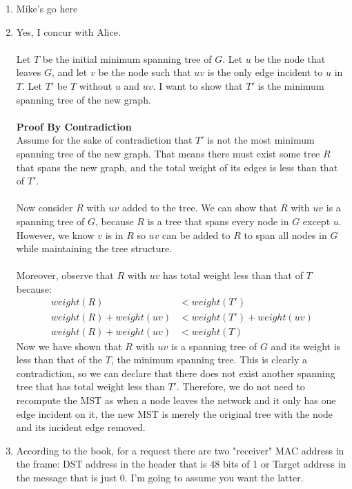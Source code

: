 \documentclass[12pt]{article}
\begin{document}
\begin{enumerate}
	\item Mike's go here
	\item Yes, I concur with Alice. \\ \\Let $T$ be the initial minimum spanning tree of $G$. Let $u$ be the node that leaves $G$, and let $v$ be the node such that $uv$ is the only edge incident to $u$ in $T$. Let $T'$ be $T$ without $u$ and $uv$. I want to show that $T'$ is the minimum spanning tree of the new graph. \\ \\ \textbf{Proof By Contradiction} \\ Assume for the sake of contradiction that $T'$ is not the most minimum spanning tree of the new graph. That means there must exist some tree $R$ that spans the new graph, and the total weight of its edges is less than that of $T'$. \\ \\ Now consider $R$ with $uv$ added to the tree. We can show that $R$ with $uv$ is a spanning tree of $G$, because $R$ is a tree that spans every node in $G$ except $u$. However, we know $v$ is in $R$ so $uv$ can be added to $R$ to span all nodes in $G$ while maintaining the tree structure. \\ \\ Moreover, observe that $R$ with $uv$ has total weight less than that of $T$ because:
	\begin{align*}
	weight(R) &< weight(T')\\
	weight(R) + weight(uv) &< weight(T') + weight(uv)\\
	weight(R) + weight(uv) &< weight(T)
	\end{align*}
	Now we have shown that $R$ with $uv$ is a spanning tree of $G$ and its weight is less than that of the $T$, the minimum spanning tree. This is clearly a contradiction, so we can declare that there does not exist another spanning tree that has total weight less than $T'$. Therefore, we do not need to recompute the MST as when a node leaves the network and it only has one edge incident on it, the new MST is merely the original tree with the node and its incident edge removed.
	\item
        According to the book, for a request there are two "receiver" MAC address in the frame:
        DST address in the header that is 48 bits of 1 or Target address in the message
        that is just 0. I'm going to assume you want the latter. \\


\end{enumerate}
\end{document}
